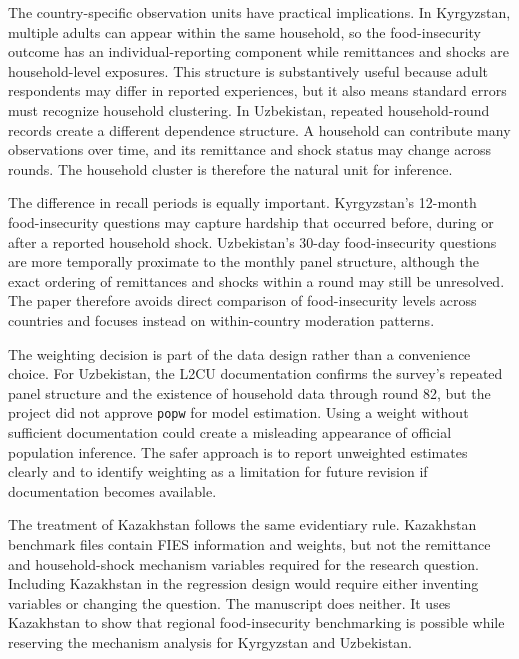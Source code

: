 \documentclass[11pt]{article}
\begin{document}
The country-specific observation units have practical implications. In Kyrgyzstan, multiple adults can appear within the same household, so the food-insecurity outcome has an individual-reporting component while remittances and shocks are household-level exposures. This structure is substantively useful because adult respondents may differ in reported experiences, but it also means standard errors must recognize household clustering. In Uzbekistan, repeated household-round records create a different dependence structure. A household can contribute many observations over time, and its remittance and shock status may change across rounds. The household cluster is therefore the natural unit for inference.

The difference in recall periods is equally important. Kyrgyzstan's 12-month food-insecurity questions may capture hardship that occurred before, during or after a reported household shock. Uzbekistan's 30-day food-insecurity questions are more temporally proximate to the monthly panel structure, although the exact ordering of remittances and shocks within a round may still be unresolved. The paper therefore avoids direct comparison of food-insecurity levels across countries and focuses instead on within-country moderation patterns.

The weighting decision is part of the data design rather than a convenience choice. For Uzbekistan, the L2CU documentation confirms the survey's repeated panel structure and the existence of household data through round 82, but the project did not approve \texttt{popw} for model estimation. Using a weight without sufficient documentation could create a misleading appearance of official population inference. The safer approach is to report unweighted estimates clearly and to identify weighting as a limitation for future revision if documentation becomes available.

The treatment of Kazakhstan follows the same evidentiary rule. Kazakhstan benchmark files contain FIES information and weights, but not the remittance and household-shock mechanism variables required for the research question. Including Kazakhstan in the regression design would require either inventing variables or changing the question. The manuscript does neither. It uses Kazakhstan to show that regional food-insecurity benchmarking is possible while reserving the mechanism analysis for Kyrgyzstan and Uzbekistan.
\end{document}
